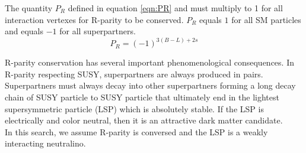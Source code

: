 \indent The quantity $P_R$ defined in equation \ref{eqn:PR} and must multiply to 1 for all interaction vertexes for R-parity to be conserved. $P_R$ equals $1$ for all SM particles and equals $-1$ for all superpartners.  \\

\begin{equation}
\label{eqn:PR}
P_R = (-1)^{3(B-L)+2s}
\end{equation}

\indent R-parity conservation has several important phenomenological consequences.  In R-parity respecting SUSY, superpartners are always produced in pairs.  Superpartners must always decay into other superpartners forming a long decay chain of SUSY particle to SUSY particle that ultimately end in the lightest supersymmetric particle (LSP) which is absolutely stable.  If the LSP is electrically and color neutral, then it is an attractive dark matter candidate.  \\

\indent In this search, we assume R-parity is conversed and the LSP is a weakly interacting neutralino.  \\
